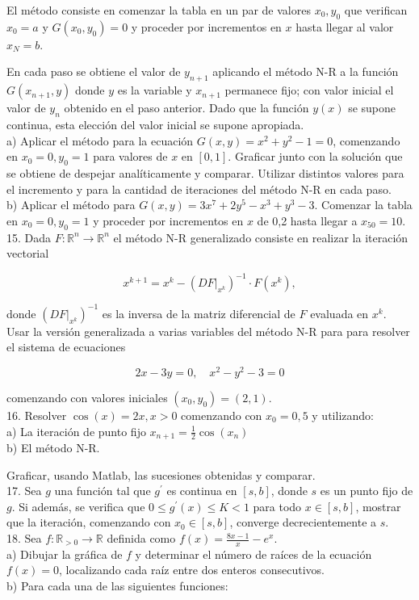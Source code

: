 \documentclass[10pt]{article}
\begin{document}
El método consiste en comenzar la tabla en un par de valores $x_{0}, y_{0}$ que verifican $x_{0}=a$ y $G\left(x_{0}, y_{0}\right)=0$ y proceder por incrementos en $x$ hasta llegar al valor $x_{N}=b$.

En cada paso se obtiene el valor de $y_{n+1}$ aplicando el método N-R a la función $G\left(x_{n+1}, y\right)$ donde $y$ es la variable y $x_{n+1}$ permanece fijo; con valor inicial el valor de $y_{n}$ obtenido en el paso anterior. Dado que la función $y(x)$ se supone continua, esta elección del valor inicial se supone apropiada.\\
a) Aplicar el método para la ecuación $G(x, y)=x^{2}+y^{2}-1=0$, comenzando en $x_{0}=0, y_{0}=1$ para valores de $x$ en $[0,1]$. Graficar junto con la solución que se obtiene de despejar analíticamente y comparar. Utilizar distintos valores para el incremento y para la cantidad de iteraciones del método N-R en cada paso.\\
b) Aplicar el método para $G(x, y)=3 x^{7}+2 y^{5}-x^{3}+y^{3}-3$. Comenzar la tabla en $x_{0}=0, y_{0}=1$ y proceder por incrementos en $x$ de 0,2 hasta llegar a $x_{50}=10$.\\
15. Dada $F: \mathbb{R}^{n} \rightarrow \mathbb{R}^{n}$ el método N-R generalizado consiste en realizar la iteración vectorial

$$
x^{k+1}=x^{k}-\left(\left.D F\right|_{x^{k}}\right)^{-1} \cdot F\left(x^{k}\right),
$$

donde $\left(\left.D F\right|_{x^{k}}\right)^{-1}$ es la inversa de la matriz diferencial de $F$ evaluada en $x^{k}$.\\
Usar la versión generalizada a varias variables del método N-R para para resolver el sistema de ecuaciones

$$
2 x-3 y=0, \quad x^{2}-y^{2}-3=0
$$

comenzando con valores iniciales $\left(x_{0}, y_{0}\right)=(2,1)$.\\
16. Resolver $\cos (x)=2 x, x>0$ comenzando con $x_{0}=0,5$ y utilizando:\\
a) La iteración de punto fijo $x_{n+1}=\frac{1}{2} \cos \left(x_{n}\right)$\\
b) El método N-R.

Graficar, usando Matlab, las sucesiones obtenidas y comparar.\\
17. Sea $g$ una función tal que $g^{\prime}$ es continua en $[s, b]$, donde $s$ es un punto fijo de $g$. Si además, se verifica que $0 \leq g^{\prime}(x) \leq K<1$ para todo $x \in[s, b]$, mostrar que la iteración, comenzando con $x_{0} \in[s, b]$, converge decrecientemente a $s$.\\
18. Sea $f: \mathbb{R}_{>0} \rightarrow \mathbb{R}$ definida como $f(x)=\frac{8 x-1}{x}-e^{x}$.\\
a) Dibujar la gráfica de $f$ y determinar el número de raíces de la ecuación $f(x)=0$, localizando cada raíz entre dos enteros consecutivos.\\
b) Para cada una de las siguientes funciones:
\end{document}
